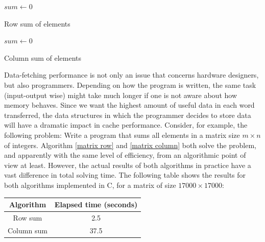\documentclass[12pt]{diicc}
\begin{document}
\begin{algorithm}
$sum \leftarrow 0$ \\
\caption{Row sum of elements\label{matrix row}}
\end{algorithm}

\begin{algorithm}
$sum \leftarrow 0$ \\
\caption{Column sum of elements\label{matrix column}}
\end{algorithm}

Data-fetching performance is not only an issue that concerns hardware designers, but also programmers. Depending on how the program is written, the same task (input-output wise) might take much longer if one is not aware about how memory behaves. Since we want the highest amount of useful data in each word transferred, the data structures in which the programmer decides to store data will have a dramatic impact in cache performance. Consider, for example, the following problem: Write a program that sums all elements in a matrix size $m \times n$ of integers. Algorithm \ref{matrix row} and \ref{matrix column} both solve the problem, and apparently with the same level of efficiency, from an algorithmic point of view at least. However, the actual results of both algorithms in practice have a vast difference in total solving time. The following table shows the results for both algorithms implemented in C, for a matrix of size $17000 \times 17000$:
\begin{center}
\begin{tabular}{ c | c }
  Algorithm & Elapsed time (seconds) \\ \hline
  Row sum & 2.5 \\
  Column sum & 37.5 \\ 
\end{tabular}
\end{center}
\end{document}
